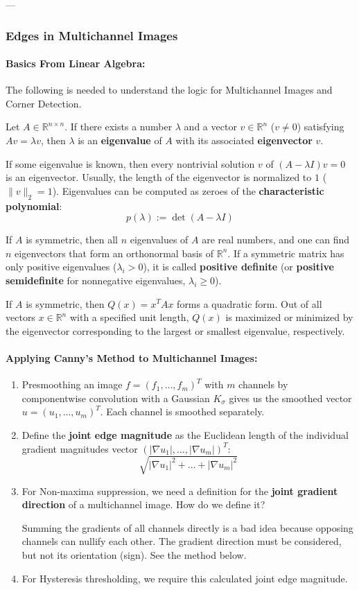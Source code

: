 \documentclass{article}
\begin{document}
---

\subsubsection{Edges in Multichannel Images}
\paragraph{Basics From Linear Algebra:} The following is needed to understand the logic for Multichannel Images and Corner Detection.

Let $A \in \mathbb{R}^{n\times n}$. If there exists a number $\lambda$ and a vector $v \in \mathbb{R}^n$ ($v \neq 0$) satisfying $Av = \lambda v$, then $\lambda$ is an \textbf{eigenvalue} of $A$ with its associated \textbf{eigenvector} $v$. 

If some eigenvalue is known, then every nontrivial solution $v$ of $(A-\lambda I)v = 0$ is an eigenvector. Usually, the length of the eigenvector is normalized to $1$ ($\|v\|_2 = 1$). Eigenvalues can be computed as zeroes of the \textbf{characteristic polynomial}:
\[ p(\lambda) := \det(A-\lambda I) \]

If $A$ is symmetric, then all $n$ eigenvalues of $A$ are real numbers, and one can find $n$ eigenvectors that form an orthonormal basis of $\mathbb{R}^n$. If a symmetric matrix has only positive eigenvalues ($\lambda_i > 0$), it is called \textbf{positive definite} (or \textbf{positive semidefinite} for nonnegative eigenvalues, $\lambda_i \geq 0$).

If $A$ is symmetric, then $Q(x) = x^TAx$ forms a quadratic form. Out of all vectors $x \in \mathbb{R}^n$ with a specified unit length, $Q(x)$ is maximized or minimized by the eigenvector corresponding to the largest or smallest eigenvalue, respectively.

\paragraph{Applying Canny's Method to Multichannel Images:}
\begin{enumerate}
  \item Presmoothing an image $f = (f_1,\dots,f_m)^T$ with $m$ channels by componentwise convolution with a Gaussian $K_\sigma$ gives us the smoothed vector $u = (u_1,\dots,u_m)^T$. Each channel is smoothed separately.
  \item Define the \textbf{joint edge magnitude} as the Euclidean length of the individual gradient magnitudes vector $(|\nabla u_1|,\dots,|\nabla u_m|)^T$:
  \[ \sqrt{|\nabla u_1|^2 + \dots + |\nabla u_m|^2} \]
  \item For Non-maxima suppression, we need a definition for the \textbf{joint gradient direction} of a multichannel image. How do we define it?
  
  Summing the gradients of all channels directly is a bad idea because opposing channels can nullify each other. The gradient direction must be considered, but not its orientation (sign). See the method below.
  
  \item For Hysteresis thresholding, we require this calculated joint edge magnitude.
\end{enumerate}
\end{document}
